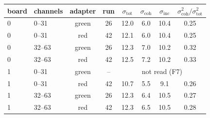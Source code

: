 \begin{tabular}{llcccccc}
\toprule
board & channels & adapter & run & $\sigma_\mathrm{tot}$ & $\sigma_\mathrm{coh}$ & $\sigma_\mathrm{inc}$ & $\sigma_\mathrm{coh}^2/\sigma_\mathrm{tot}^2$ \\
\midrule
0 & 0--31 & green & 26 & 12.0 & 6.0 & 10.4 & 0.25 \\
0 & 0--31 & red & 42 & 12.1 & 6.0 & 10.4 & 0.25 \\
0 & 32--63 & green & 26 & 12.3 & 7.0 & 10.2 & 0.32 \\
0 & 32--63 & red & 42 & 12.5 & 7.2 & 10.2 & 0.33 \\
1 & 0--31 & green & -- & \multicolumn{4}{c}{not read (F7)} \\
1 & 0--31 & red & 42 & 10.7 & 5.5 & 9.1 & 0.26 \\
1 & 32--63 & green & 26 & 12.3 & 6.4 & 10.5 & 0.27 \\
1 & 32--63 & red & 42 & 12.3 & 6.5 & 10.5 & 0.28 \\
\bottomrule
\end{tabular}

